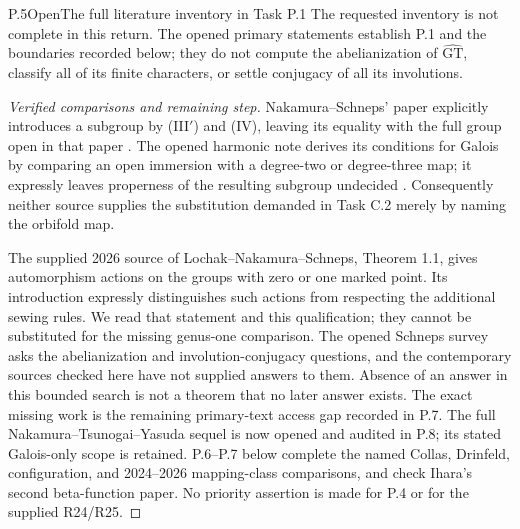 \begin{statement}{P.5}{Open}{The full literature inventory in Task P.1}
The requested inventory is not complete in this return.
The opened primary statements establish P.1 and the boundaries
recorded below; they do not compute the abelianization of
$\widehat{\mathrm{GT}}$, classify all of its finite characters,
or settle conjugacy of all its involutions.
\end{statement}
\begin{proof}[Verified comparisons and remaining step]
Nakamura--Schneps' paper explicitly introduces a subgroup by
(III$'$) and (IV), leaving its equality with the full group open
in that paper \cite[\S1]{PBC_NS2000}. The opened harmonic note
derives its conditions for Galois by comparing an open immersion
with a degree-two or degree-three map; it expressly leaves
properness of the resulting subgroup undecided
\cite[\S1]{PBC_NT2002}. Consequently neither source supplies
the substitution demanded in Task C.2 merely by naming the
orbifold map.

The supplied 2026 source of Lochak--Nakamura--Schneps, Theorem 1.1,
gives automorphism actions on the groups with zero or one marked
point. Its introduction expressly distinguishes such actions
from respecting the additional sewing rules. We read that
statement and this qualification; they cannot be substituted
for the missing genus-one comparison. The opened Schneps survey
asks the abelianization and involution-conjugacy questions,
and the contemporary sources checked here have not supplied
answers to them. Absence of an answer in this bounded search
is not a theorem that no later answer exists. The exact missing
work is the remaining primary-text access gap recorded in P.7.
The full Nakamura--Tsunogai--Yasuda sequel is now opened
and audited in P.8; its stated Galois-only scope is retained.
P.6--P.7 below complete the named Collas, Drinfeld, configuration,
and 2024--2026 mapping-class comparisons, and check Ihara's second
beta-function paper. No priority assertion is made for P.4
or for the supplied R24/R25.
\end{proof}


